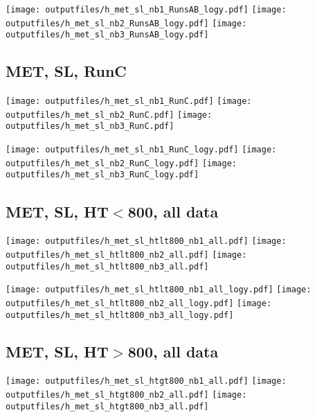 \documentclass[11pt]{article}
\begin{document}
    \noindent
     \texttt{[image: outputfiles/h\_met\_sl\_nb1\_RunsAB\_logy.pdf]}
     \texttt{[image: outputfiles/h\_met\_sl\_nb2\_RunsAB\_logy.pdf]}
     \texttt{[image: outputfiles/h\_met\_sl\_nb3\_RunsAB\_logy.pdf]}


     \subsection{ MET, SL, RunC}

    \noindent
     \texttt{[image: outputfiles/h\_met\_sl\_nb1\_RunC.pdf]}
     \texttt{[image: outputfiles/h\_met\_sl\_nb2\_RunC.pdf]}
     \texttt{[image: outputfiles/h\_met\_sl\_nb3\_RunC.pdf]}

    \noindent
     \texttt{[image: outputfiles/h\_met\_sl\_nb1\_RunC\_logy.pdf]}
     \texttt{[image: outputfiles/h\_met\_sl\_nb2\_RunC\_logy.pdf]}
     \texttt{[image: outputfiles/h\_met\_sl\_nb3\_RunC\_logy.pdf]}


     \subsection{ MET, SL, HT$<$800, all data}

    \noindent
     \texttt{[image: outputfiles/h\_met\_sl\_htlt800\_nb1\_all.pdf]}
     \texttt{[image: outputfiles/h\_met\_sl\_htlt800\_nb2\_all.pdf]}
     \texttt{[image: outputfiles/h\_met\_sl\_htlt800\_nb3\_all.pdf]}

    \noindent
     \texttt{[image: outputfiles/h\_met\_sl\_htlt800\_nb1\_all\_logy.pdf]}
     \texttt{[image: outputfiles/h\_met\_sl\_htlt800\_nb2\_all\_logy.pdf]}
     \texttt{[image: outputfiles/h\_met\_sl\_htlt800\_nb3\_all\_logy.pdf]}


     \subsection{ MET, SL, HT$>$800, all data}

    \noindent
     \texttt{[image: outputfiles/h\_met\_sl\_htgt800\_nb1\_all.pdf]}
     \texttt{[image: outputfiles/h\_met\_sl\_htgt800\_nb2\_all.pdf]}
     \texttt{[image: outputfiles/h\_met\_sl\_htgt800\_nb3\_all.pdf]}
\end{document}
